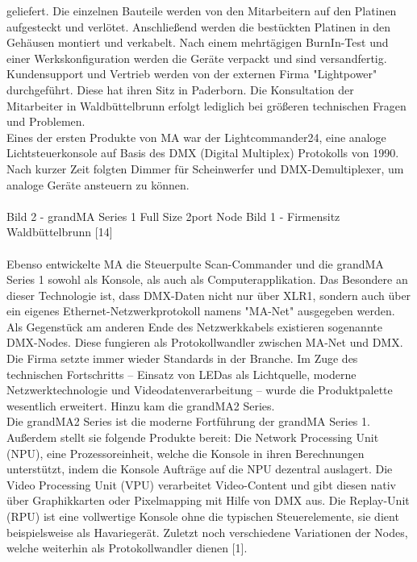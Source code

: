 \documentclass[11pt]{scrartcl}
\begin{document}
geliefert. Die einzelnen Bauteile werden von den
Mitarbeitern auf den Platinen aufgesteckt und verlötet.
Anschließend werden die bestückten Platinen in den Gehäusen montiert und verkabelt. Nach einem
mehrtägigen BurnIn-Test und einer Werkskonfiguration werden die Geräte verpackt und sind
versandfertig.\\
Kundensupport und Vertrieb werden von der externen Firma "Lightpower" durchgeführt. Diese hat
ihren Sitz in Paderborn. Die Konsultation der Mitarbeiter in Waldbüttelbrunn erfolgt lediglich bei
größeren technischen Fragen und Problemen.\\
Eines der ersten Produkte von MA war der Lightcommander24, eine analoge Lichtsteuerkonsole auf
Basis des DMX (Digital Multiplex) Protokolls von 1990. Nach kurzer Zeit folgten Dimmer für
Scheinwerfer und DMX-Demultiplexer, um analoge Geräte ansteuern zu können.\\
\\
Bild 2 - grandMA Series 1 Full Size 2port Node
Bild 1 - Firmensitz Waldbüttelbrunn [14]\\
\\
Ebenso entwickelte MA die Steuerpulte Scan-Commander und die grandMA Series 1 sowohl als
Konsole, als auch als Computerapplikation. Das Besondere an dieser Technologie ist, dass DMX-Daten
nicht nur über XLR1, sondern auch über ein eigenes Ethernet-Netzwerkprotokoll namens "MA-Net"
ausgegeben werden. Als Gegenstück am anderen Ende des Netzwerkkabels existieren sogenannte
DMX-Nodes. Diese fungieren als Protokollwandler zwischen MA-Net und DMX.\\
Die Firma setzte immer wieder Standards in der Branche. Im Zuge des technischen Fortschritts –
Einsatz von LEDas als Lichtquelle, moderne Netzwerktechnologie und Videodatenverarbeitung –
wurde die Produktpalette wesentlich erweitert. Hinzu kam die grandMA2 Series.\\
Die grandMA2 Series ist die moderne Fortführung der grandMA Series 1. Außerdem stellt sie
folgende Produkte bereit: Die Network Processing Unit (NPU), eine Prozessoreinheit, welche die
Konsole in ihren Berechnungen unterstützt, indem die Konsole Aufträge auf die NPU dezentral
auslagert. Die Video Processing Unit (VPU) verarbeitet Video-Content und gibt diesen nativ über
Graphikkarten oder Pixelmapping mit Hilfe von DMX aus. Die Replay-Unit (RPU) ist eine vollwertige
Konsole ohne die typischen Steuerelemente, sie dient beispielsweise als Havariegerät. Zuletzt noch
verschiedene Variationen der Nodes, welche weiterhin als Protokollwandler dienen [1].\\
\end{document}
